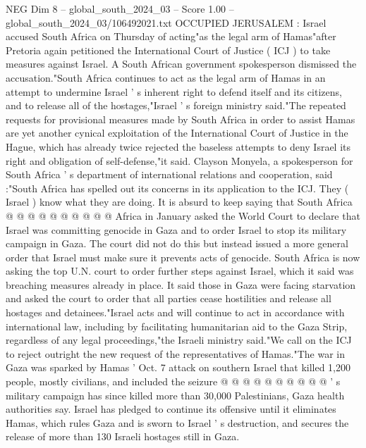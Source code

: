 \begin{textsample}{NEG Dim 8 – global\_south\_2024\_03 – Score 1.00 – global\_south\_2024\_03/106492021.txt}  \label{ex:f8_neg_366}
OCCUPIED JERUSALEM : Israel accused South Africa on Thursday of acting"as the legal arm of Hamas"after Pretoria again petitioned the International Court of Justice ( ICJ ) to take measures against Israel.
A South African government spokesperson dismissed the accusation."South Africa continues to act as the legal arm of Hamas in an attempt to undermine Israel ' s inherent right to defend itself and its citizens, and to release all of the hostages,"Israel ' s foreign ministry said."The repeated requests for provisional measures made by South Africa in order to assist Hamas are yet another cynical exploitation of the International Court of Justice in the Hague, which has already twice rejected the baseless attempts to deny Israel its right and obligation of self-defense,"it said.
Clayson Monyela, a spokesperson for South Africa ' s department of international relations and cooperation, said :"South Africa has spelled out its concerns in its application to the ICJ.
They ( Israel ) know what they are doing.
It is absurd to keep saying that South Africa @ @ @ @ @ @ @ @ @ @ Africa in January asked the World Court to declare that Israel was committing genocide in Gaza and to order Israel to stop its military campaign in Gaza.
The court did not do this but instead issued a more general order that Israel must make sure it prevents acts of genocide.
South Africa is now asking the top U.N. court to order further steps against Israel, which it said was breaching measures already in place.
It said those in Gaza were facing starvation and asked the court to order that all parties cease hostilities and release all hostages and detainees."Israel acts and will continue to act in accordance with international law, including by facilitating humanitarian aid to the Gaza Strip, regardless of any legal proceedings,"the Israeli ministry said."We call on the ICJ to reject outright the new request of the representatives of Hamas."The war in Gaza was sparked by Hamas ' Oct. 7 attack on southern Israel that killed 1,200 people, mostly civilians, and included the seizure @ @ @ @ @ @ @ @ @ @ ' s military campaign has since killed more than 30,000 Palestinians, Gaza health authorities say.
Israel has pledged to continue its offensive until it eliminates Hamas, which rules Gaza and is sworn to Israel ' s destruction, and secures the release of more than 130 Israeli hostages still in Gaza.

\end{textsample}
